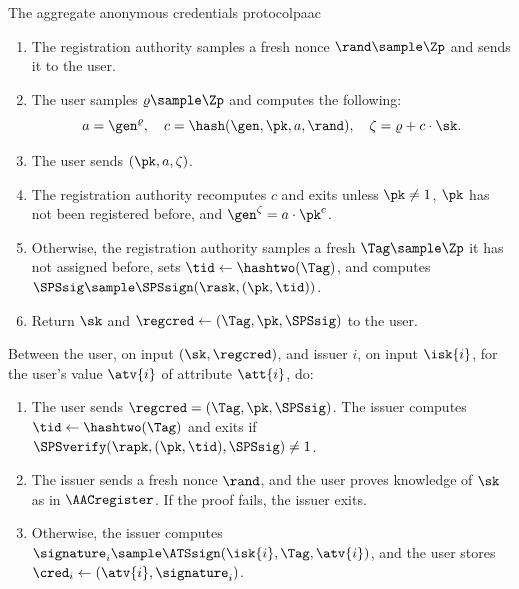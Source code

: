 \begin{protocolbox}{The aggregate anonymous credentials protocol}{paac}
\begin{description}
\begin{enumerate}
	\item The registration authority samples a fresh nonce $\rand \sample \Zp$ and sends it to
the user.

	\item The user samples $\varrho \sample \Zp$ and computes the following:
	  \begin{equation*}
	    a = \gen^\varrho, \quad c = \hash(\gen, \pk, a, \rand), \quad \zeta =
\varrho + c \cdot \sk.
	  \end{equation*}

	\item The user sends $(\pk, a, \zeta)$.

	\item The registration authority recomputes $c$ and exits unless $\pk \neq 1$, $\pk$ has not
been registered before, and $\gen^\zeta = a \cdot \pk^c$.

	\item Otherwise, the registration authority samples a fresh $\Tag \sample \Zp$ it has not
assigned before, sets $\tid \leftarrow \hashtwo(\Tag)$, and computes $\SPSsig
\sample \SPSsign(\rask,(\pk,\tid))$.

	\item Return $\sk$ and $\regcred \leftarrow (\Tag,\pk,\SPSsig)$ to the
user.

      \end{enumerate}

    \item[$\cred \sample \AACissue(\crs,\isk{i},\sk,\regcred,\atv{i})$ :] Between
the user, on input $(\sk, \regcred)$, and issuer $i$, on input $\isk{i}$, for
the user's value $\atv{i}$ of attribute $\att{i}$, do:

      \begin{enumerate}

	\item The user sends $\regcred = (\Tag,\pk,\SPSsig)$. The issuer
computes $\tid \leftarrow \hashtwo(\Tag)$ and exits if
$\SPSverify(\rapk,(\pk,\tid),\SPSsig) \neq 1$.

	\item The issuer sends a fresh nonce $\rand$, and the user proves
knowledge of $\sk$ as in $\AACregister$. If the proof fails, the issuer exits.

	\item Otherwise, the issuer computes $\signature_i \sample
\ATSsign(\isk{i},\Tag,\atv{i})$, and the user stores $\cred_i \leftarrow
(\atv{i},\signature_i)$.


\end{enumerate}
\end{description}
\end{protocolbox}
